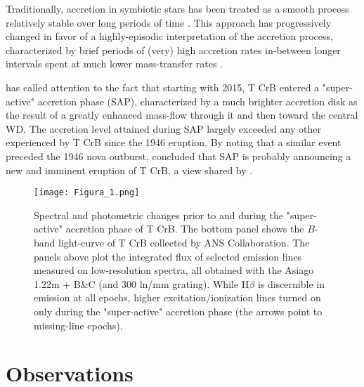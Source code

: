 \documentclass{aastex631}
\begin{document}
Traditionally, accretion in symbiotic stars has been treated as a smooth
process relatively stable over long periods of time
\citep[eg.][]{1986syst.book.....K}.  This approach has progressively changed
in favor of a highly-episodic interpretation of the accretion process,
characterized by brief periods of (very) high accretion rates in-between
longer intervals spent at much lower mass-transfer rates
\citep[eg.][]{2020ApJ...902L..14L,2021MNRAS.505.6121M}.
 
\citet{2016NewA...47....7M} has called attention to the fact that starting
with 2015, T CrB entered a "super-active" accretion phase (SAP),
characterized by a much brighter accretion disk as the result of a greatly
enhanced mass-flow through it and then toward the central WD.  The accretion
level attained during SAP largely exceeded any other experienced by T CrB
since the 1946 eruption.  By noting that a similar event preceded the 1946
nova outburst, \citet{2016NewA...47....7M} concluded that SAP is probably
announcing a new and imminent eruption of T CrB, a view shared by
\citet{2023arXiv230304933S}.

\begin{figure}
\texttt{[image: Figura\_1.png]}
\caption{Spectral and photometric changes prior to and during the "super-active"
accretion phase of T CrB. The bottom panel shows the $B$-band light-curve of
T CrB collected by ANS Collaboration. The panels above plot the integrated
flux of selected emission lines measured on low-resolution spectra, all obtained
with the Asiago 1.22m + B\&C (and 300 ln/mm grating). While H$\beta$ is discernible
in emission at all epochs, higher excitation/ionization lines turned on only during
the "super-active" accretion phase (the arrows point to missing-line epochs).}
\label{fig:fig1}
\end{figure}

\section{Observations} \label{sec:obs}
\end{document}
